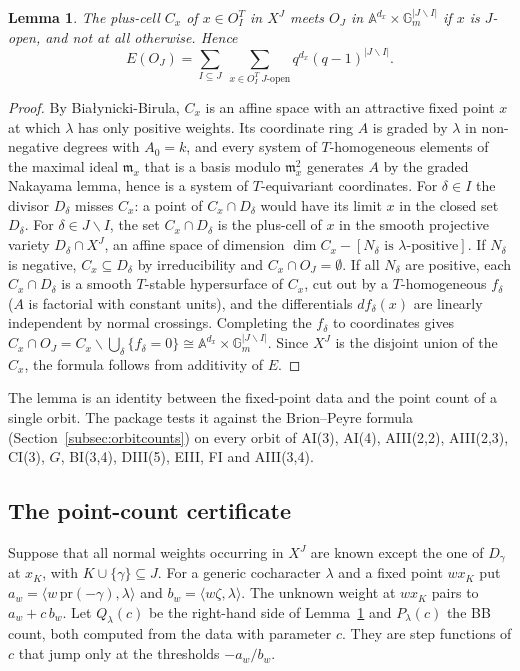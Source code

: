 \documentclass[11pt]{amsart}
\newtheorem{lemma}[theorem]{Lemma}
\theoremstyle{definition}
\theoremstyle{remark}
\newcommand{\pr}{\mathrm{pr}}
\begin{document}
\begin{lemma}\label{lem:openorbit}
The plus-cell $C_x$ of $x\in O_I^T$ in $X^J$ meets $O_J$ in
$\mathbb A^{d_x}\times\mathbb G_m^{|J\smallsetminus I|}$ if $x$ is $J$-open,
and not at all otherwise. Hence
\[
E(O_J) = \sum_{I\subseteq J}\ \sum_{x\in O_I^T\ J\text{-open}} q^{d_x}(q-1)^{|J\smallsetminus I|}.
\]
\end{lemma}
\begin{proof}
By Bia{\l}ynicki-Birula, $C_x$ is an affine space with an attractive fixed
point $x$ at which $\lambda$ has only positive weights. Its coordinate ring
$A$ is graded by $\lambda$ in non-negative degrees with $A_0=k$, and every
system of $T$-homogeneous elements of the maximal ideal $\mathfrak m_x$ that
is a basis modulo $\mathfrak m_x^2$ generates $A$ by the graded Nakayama
lemma, hence is a system of $T$-equivariant coordinates. For
$\delta\in I$ the divisor $D_\delta$ misses $C_x$: a point of
$C_x\cap D_\delta$ would have its limit $x$ in the closed set $D_\delta$. For
$\delta\in J\smallsetminus I$, the set $C_x\cap D_\delta$ is the plus-cell of
$x$ in the smooth projective variety $D_\delta\cap X^J$, an affine space of
dimension $\dim C_x - [N_\delta\text{ is }\lambda\text{-positive}]$. If
$N_\delta$ is negative, $C_x\subseteq D_\delta$ by irreducibility and
$C_x\cap O_J=\emptyset$. If all $N_\delta$ are positive, each $C_x\cap
D_\delta$ is a smooth $T$-stable hypersurface of $C_x$, cut out by a
$T$-homogeneous $f_\delta$ ($A$ is factorial with constant units), and the
differentials $df_\delta(x)$ are linearly independent by normal crossings.
Completing the $f_\delta$ to coordinates gives
$C_x\cap O_J = C_x\smallsetminus\bigcup_\delta\{f_\delta=0\}\cong\mathbb
A^{d_x}\times\mathbb G_m^{|J\smallsetminus I|}$. Since $X^J$ is the disjoint
union of the $C_x$, the formula follows from additivity of $E$.
\end{proof}

The lemma is an identity between the fixed-point data and the point count
of a single orbit. The package tests it against the Brion--Peyre formula
(Section~\ref{subsec:orbitcounts}) on every orbit of AI(3), AI(4), AIII(2,2),
AIII(2,3), CI(3), $G$, BI(3,4), DIII(5), EIII, FI and AIII(3,4).

\subsection{The point-count certificate}
Suppose that all normal weights occurring in $X^J$ are known except the one
of $D_\gamma$ at $x_K$, with $K\cup\{\gamma\}\subseteq J$. For a generic
cocharacter $\lambda$ and a fixed point $wx_K$ put
$a_w = \langle w\,\pr(-\gamma),\lambda\rangle$ and
$b_w = \langle w\zeta,\lambda\rangle$. The unknown weight at $wx_K$ pairs to
$a_w+c\,b_w$. Let $Q_\lambda(c)$ be the right-hand side of
Lemma~\ref{lem:openorbit} and $P_\lambda(c)$ the BB count, both computed from
the data with parameter $c$. They are step functions of $c$ that jump only
at the thresholds $-a_w/b_w$.
\end{document}
